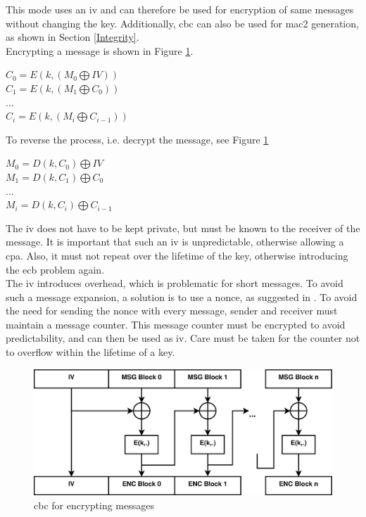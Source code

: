 This mode uses an \gls{iv} and can therefore be used for encryption of same messages without changing the key. Additionally, \gls{cbc} can also be used
for \gls{mac2} generation, as shown in Section \ref{Integrity}.
\\
Encrypting a message is shown in Figure \ref{fig:cbc_encrypt}.
\begin{center}
$ C_0 = E(k, (M_0 \bigoplus IV ) )  $
\\
$ C_1 = E(k, (M_1  \bigoplus C_0) ) $
\\
$...$
\\
$ C_i = E(k, (M_i \bigoplus C_{i-1} ) )  $
\end{center}
To reverse the process, i.e. decrypt the message, see Figure \ref{fig:cbc_encrypt}
\begin{center}
$ M_0 = D(k, C_0) \bigoplus IV $
\\
$ M_1 = D(k, C_1) \bigoplus C_0 $
\\
$...$
\\
$ M_i = D(k, C_i) \bigoplus C_{i-1} $
\end{center}
The \gls{iv} does not have to be kept private, but must be known to the receiver of the message. It is important that such an \gls{iv} is unpredictable, otherwise
allowing a \gls{cpa}. Also, it must not repeat over the lifetime of the key, otherwise introducing the \gls{ecb} problem again. 
\\
The \gls{iv} introduces overhead, which is problematic for  short messages.
To avoid such a message expansion, a solution is to use a nonce, as suggested in \cite{cryptoEng}.
To avoid the need for sending the nonce with every message, sender and receiver must maintain a message counter. This message counter must be encrypted to avoid predictability, and can
then be used as \gls{iv}. Care must be taken for the counter not to overflow within the lifetime of a key.

\begin{figure}
    \centering
    \includegraphics[width=1\textwidth]{figures/CBCencrypt.eps}
    \caption{\gls{cbc} for encrypting messages}
    \label{fig:cbc_encrypt}
\end{figure}

